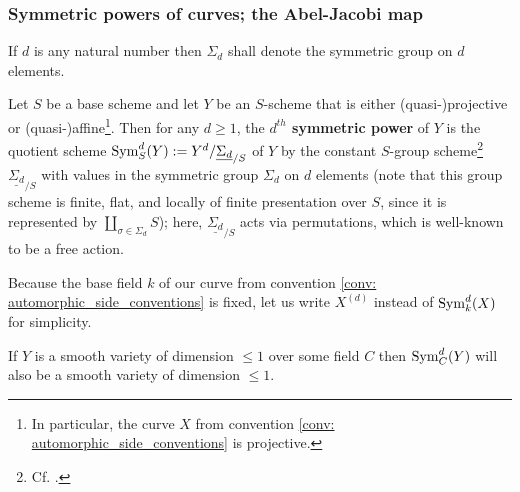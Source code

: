             \subsubsection{Symmetric powers of curves; the Abel-Jacobi map}
                \begin{convention} \label{conv: symmetric_group}
                    If $d$ is any natural number then $\Sigma_d$ shall denote the symmetric group on $d$ elements.
                \end{convention}
                \begin{definition} \label{def: symmetric_powers_of_schemes}
                    Let $S$ be a base scheme and let $Y$ be an $S$-scheme that is either (quasi-)projective or (quasi-)affine\footnote{In particular, the curve $X$ from convention \ref{conv: automorphic_side_conventions} is projective.}. Then for any $d \geq 1$, the \textbf{$d^{th}$ symmetric power} of $Y$ is the quotient scheme $\mathrm{Sym}^d_S(Y) := Y^d/\underline{\Sigma_d}_{/S}$ of $Y$ by the constant $S$-group scheme\footnote{Cf. \cite[\href{https://stacks.math.columbia.edu/tag/03YW}{Tag 03YW}]{stacks}.} $\underline{\Sigma_d}_{/S}$ with values in the symmetric group $\Sigma_d$ on $d$ elements (note that this group scheme is finite, flat, and locally of finite presentation over $S$, since it is represented by $\coprod_{\sigma \in \Sigma_d} S$); here, $\underline{\Sigma_d}_{/S}$ acts via permutations, which is well-known to be a free action.
                \end{definition}
                \begin{convention}
                    Because the base field $k$ of our curve from convention \ref{conv: automorphic_side_conventions} is fixed, let us write $X^{(d)}$ instead of $\mathrm{Sym}^d_k(X)$ for simplicity.
                \end{convention}
                \begin{lemma} \label{lemma: smoothness_of_symmetric_powers}
                    If $Y$ is a smooth variety of dimension $\leq 1$ over some field $C$ then $\mathrm{Sym}_C^d(Y)$ will also be a smooth variety of dimension $\leq 1$.
                \end{lemma}
